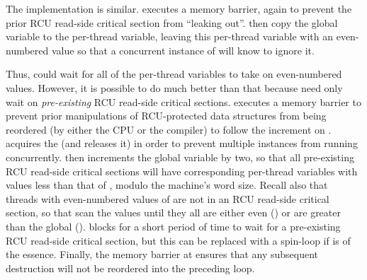\begin{fcvref}
The  implementation is similar.
 executes a memory barrier, again to prevent the prior RCU
read-side critical section from ``leaking out''.
 then copy the  global variable to the
 per-thread variable, leaving this per-thread
variable with an even-numbered value so that a concurrent instance
of  will know to ignore it.
\end{fcvref}

\QuickQuizEnd

\begin{fcvref}
Thus,  could wait for all of the per-thread
 variables to take on even-numbered values.
However, it is possible to do much better than that because
 need only wait on \emph{pre-existing}
RCU read-side critical sections.
 executes a memory barrier to prevent prior manipulations
of RCU-protected data structures from being reordered (by either
the CPU or the compiler) to follow the increment on
.
 acquires the 
(and  releases it)
in order to prevent multiple
 instances from running concurrently.
 then increments the global  variable by
two, so that all pre-existing RCU read-side critical sections will
have corresponding per-thread  variables with
values less than that of , modulo the machine's
word size.
Recall also that threads with even-numbered values of 
are not in an RCU read-side critical section,
so that 
scan the  values until they
all are either even () or are greater than the global
 ().
 blocks for a short period of time to wait for a
pre-existing RCU read-side critical section, but this can be replaced with
a spin-loop if  is of the essence.
Finally, the memory barrier at  ensures that any subsequent
destruction will not be reordered into the preceding loop.
\end{fcvref}

